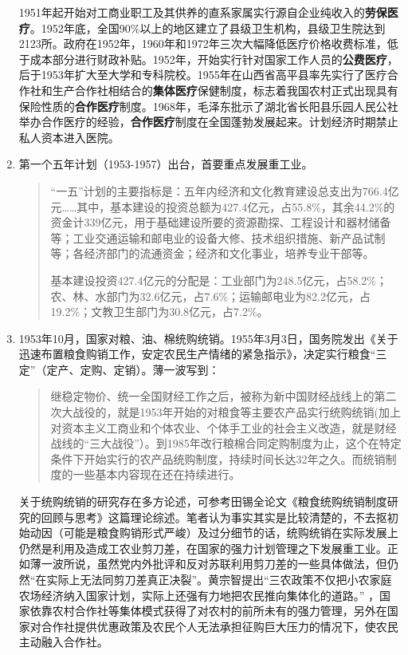 \begin{enumerate}
  1951年起开始对工商业职工及其供养的直系家属实行源自企业纯收入的\textbf{劳保医疗}。1952年底，全国90\%以上的地区建立了县级卫生机构，县级卫生院达到2123所。政府在1952年，1960年和1972年三次大幅降低医疗价格收费标准，低于成本部分进行财政补贴。1952年，开始实行针对国家工作人员的\textbf{公费医疗}，后于1953年扩大至大学和专科院校。1955年在山西省高平县率先实行了医疗合作社和生产合作社相结合的\textbf{集体医疗}保健制度，标志着我国农村正式出现具有保险性质的\textbf{合作医疗}制度。1968年，毛泽东批示了湖北省长阳县乐园人民公社举办合作医疗的经验，\textbf{合作医疗}制度在全国蓬勃发展起来。计划经济时期禁止私人资本进入医院。


\item 第一个五年计划（1953-1957）出台，首要重点发展重工业。
  \begin{quotation} “一五”计划的主要指标是：五年内经济和文化教育建设总支出为766.4亿元……其中，基本建设的投资总额为427.4亿元，占55.8\%，其余44.2\%的资金计339亿元，用于基础建设所要的资源勘探、工程设计和器材储备等；工业交通运输和邮电业的设备大修、技术组织措施、新产品试制等；各经济部门的流通资金；经济和文化事业，培养专业干部等。

    基本建设投资427.4亿元的分配是：工业部门为248.5亿元，占58.2\%；农、林、水部门为32.6亿元，占7.6\%；运输邮电业为82.2亿元，占19.2\%；文教卫生部门为30.8亿元，占7.2\%。
  \end{quotation}

\item 1953年10月，国家对粮、油、棉统购统销。1955年3月3日，国务院发出《关于迅速布置粮食购销工作，安定农民生产情绪的紧急指示》，决定实行粮食“三定”（定产、定购、定销）。薄一波写到：
  \begin{quotation}
    继稳定物价、统一全国财经工作之后，被称为新中国财经战线上的第二次大战役的，就是1953年开始的对粮食等主要农产品实行统购统销(加上对资本主义工商业和个体农业、个体手工业的社会主义改造，就是财经战线的“三大战役”）。到1985年改行粮棉合同定购制度为止，这个在特定条件下开始实行的农产品统购制度，持续时间长达32年之久。而统销制度的一些基本内容现在还在持续进行。
  \end{quotation}

  关于统购统销的研究存在多方论述，可参考田锡全论文《粮食统购统销制度研究的回顾与思考》这篇理论综述。笔者认为事实其实是比较清楚的，不去抠初始动因（可能是粮食购销形式严峻）及过分细节的话，统购统销在实际发展上仍然是利用及造成工农业剪刀差，在国家的强力计划管理之下发展重工业。正如薄一波所说，虽然党内外批评和反对苏联利用剪刀差的一些具体做法，但仍然“在实际上无法同剪刀差真正决裂”。黄宗智提出“三农政策不仅把小农家庭农场经济纳入国家计划，实际上还强有力地把农民推向集体化的道路。” ，国家依靠农村合作社等集体模式获得了对农村的前所未有的强力管理，另外在国家对合作社提供优惠政策及农民个人无法承担征购巨大压力的情况下，使农民主动融入合作社。


\end{enumerate}
